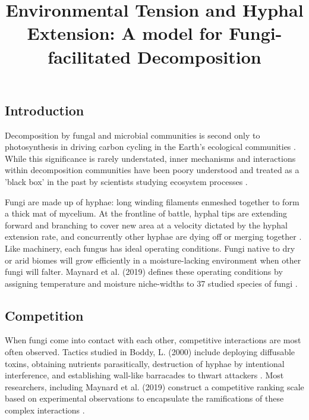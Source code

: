 \documentclass[12pt]{article}
\begin{document}
\clearpage
\title{Environmental Tension and Hyphal Extension: A model for Fungi-facilitated Decomposition}
\date{}
\maketitle
\newpage
\begin{multicols}{2}
\tableofcontents
\listoftables
\listoffigures
\pagestyle{fancy}
\newpage
\setcounter{page}{1}


	

\section{Introduction}

Decomposition by fungal and microbial communities is second only to photosynthesis in driving carbon cycling in the Earth's ecological communities \cite{McGuire2010}. While this significance is rarely understated, inner mechanisms and interactions within decomposition communities have been poory understood and treated as a 'black box' in the past by scientists studying ecosystem processes \cite{Andren1999}.

Fungi are made up of hyphae: long winding filaments enmeshed together to form a thick mat of mycelium. At the frontline of battle, hyphal tips are extending forward and branching to cover new area at a velocity dictated by the hyphal extension rate, and concurrently other hyphae are dying off or merging together \cite{Edelstein1982}. Like machinery, each fungus has ideal operating conditions. Fungi native to dry or arid biomes will grow efficiently in a moisture-lacking environment when other fungi will falter. Maynard et al. (2019) defines these operating conditions by assigning temperature and moisture niche-widths to 37 studied species of fungi \cite{Maynard2019}.

\subsection{Competition}
When fungi come into contact with each other, competitive interactions are most often observed. Tactics studied in Boddy, L. (2000) include deploying diffusable toxins, obtaining nutrients parasitically, destruction of hyphae by intentional interference, and establishing wall-like barracades to thwart attackers \cite{Boddy2000}. Most researchers, including Maynard et al. (2019) construct a competitive ranking scale based on experimental observations to encapsulate the ramifications of these complex interactions \cite{Maynard2019}.


\end{multicols}
\end{document}
